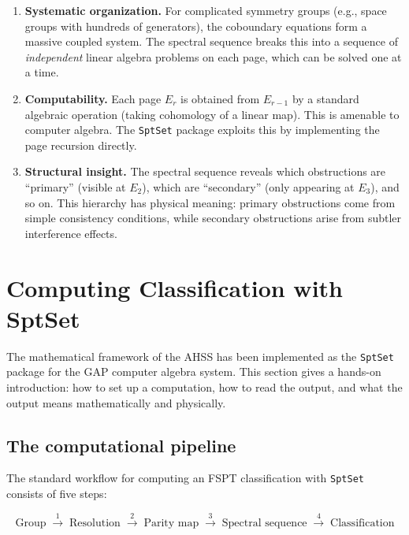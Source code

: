 \documentclass{SciPost}
\theoremstyle{definition}
\begin{document}
\begin{enumerate}[label=(\roman*)]
    \item \textbf{Systematic organization.}
    For complicated symmetry groups (e.g., space groups with hundreds of generators), the coboundary equations form a massive coupled system.
    The spectral sequence breaks this into a sequence of \emph{independent} linear algebra problems on each page, which can be solved one at a time.

    \item \textbf{Computability.}
    Each page $E_r$ is obtained from $E_{r-1}$ by a standard algebraic operation (taking cohomology of a linear map).
    This is amenable to computer algebra.
    The \texttt{SptSet} package exploits this by implementing the page recursion directly.

    \item \textbf{Structural insight.}
    The spectral sequence reveals which obstructions are ``primary'' (visible at $E_2$), which are ``secondary'' (only appearing at $E_3$), and so on.
    This hierarchy has physical meaning: primary obstructions come from simple consistency conditions, while secondary obstructions arise from subtler interference effects.
\end{enumerate}


\section{Computing Classification with SptSet}
\label{sec:sptset-classification}

The mathematical framework of the AHSS has been implemented as the \texttt{SptSet} package for the GAP computer algebra system.
This section gives a hands-on introduction: how to set up a computation, how to read the output, and what the output means mathematically and physically.

\subsection{The computational pipeline}
\label{subsec:pipeline}

The standard workflow for computing an FSPT classification with \texttt{SptSet} consists of five steps:

\begin{equation}
\boxed{\text{Group}} \;\xrightarrow{1}\; \boxed{\text{Resolution}} \;\xrightarrow{2}\; \boxed{\text{Parity map}} \;\xrightarrow{3}\; \boxed{\text{Spectral sequence}} \;\xrightarrow{4}\; \boxed{\text{Classification}}
\end{equation}
\end{document}
